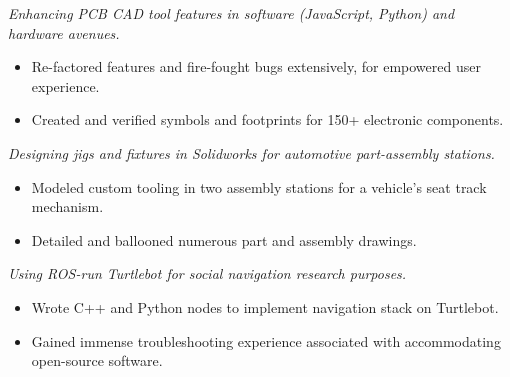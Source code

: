 \documentclass{resume}
\begin{document}
\textit{Enhancing PCB CAD tool features in software (JavaScript, Python) and hardware avenues.}
\begin{itemize}
  \item Re-factored features and fire-fought bugs extensively, for empowered user experience.
  \item Created and verified symbols and footprints for 150+ electronic components.
\end{itemize}
\begin{comment}
  Adjusted prioritization of design rules in layout constraint manager.
  Fixed incorrect drawing and positioning of constraint violation layout bodies.
  Re-factored event-listening logic for drawing nets in schematic editor.
  Corrected pin manager's oversight in tracking connection mappings.
  Enabled efficient BGA row enumeration during footprint generation.
\end{comment}

\textit{Designing jigs and fixtures in Solidworks for automotive part-assembly stations.}
\begin{itemize}
  \item Modeled custom tooling in two assembly stations for a vehicle's seat track mechanism. %
  \item Detailed and ballooned numerous part and assembly drawings.
\end{itemize}

\textit{Using ROS-run Turtlebot for social navigation research purposes.}
\begin{itemize}
  \item Wrote C++ and Python nodes to implement navigation stack on Turtlebot. 
  \item Gained immense troubleshooting experience associated with accommodating open-source software.
\end{itemize}
\end{document}
